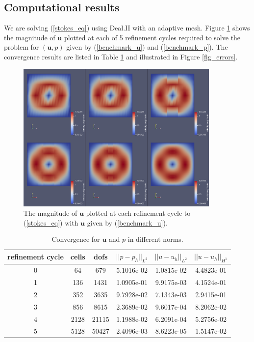\documentclass[12pt,a4paper]{article}
\theoremstyle{definition}
\begin{document}
\subsection{Computational results}
We are solving (\ref{stokes_eq}) using Deal.II with an adaptive mesh.  Figure \ref{fig_stokes_sol}  shows the magnitude of $\textbf{u}$ plotted at each of 5 refinement cycles required to solve the problem for $\left(\textbf{u}, p\right)$ given by (\ref{benchmark_u}) and (\ref{benchmark_p}).  The convergence results are listed in Table \ref{tablebenchmark_convergence} and illustrated in Figure \ref{fig_errors}.
\begin{figure}[H]
	\centering
	\includegraphics[width=10cm]{stokes_cg_velocities}
	\caption{The magnitude of $\textbf{u}$ plotted at each refinement cycle to (\ref{stokes_eq}) with $\textbf{u}$ given by (\ref{benchmark_u}).}
	\label{fig_stokes_sol}
\end{figure}
\begin{table}[H]
	\begin{center}
		\begin{tabular}{|c|c|c|c|c|c|} \hline
			refinement cycle & cells & dofs & $||p-p_h||_{L^2}$ & $||u-u_h||_{L^2}$ & $||u-u_h||_{H^1}$\\ \hline
			0 & 64 & 679 & 5.1016e-02 & 1.0815e-02 & 4.4823e-01\\ \hline
			1 & 136 & 1431 & 1.0905e-01 & 9.9175e-03 & 4.1524e-01\\ \hline
			2 & 352 & 3635 & 9.7928e-02 & 7.1343e-03 & 2.9415e-01\\ \hline
			3 & 856 & 8615 & 2.3689e-02 & 9.6017e-04 & 8.2062e-02\\ \hline
			4 & 2128 & 21115 & 1.1988e-02 & 6.2091e-04 & 5.2756e-02\\ \hline
			5 & 5128 & 50427 & 2.4096e-03 & 8.6223e-05 & 1.5147e-02\\ \hline
		\end{tabular}
		\caption{Convergence for $\textbf{u}$ and $p$ in different norms.}
		\label{tablebenchmark_convergence}
	\end{center}
\end{table}
\end{document}
